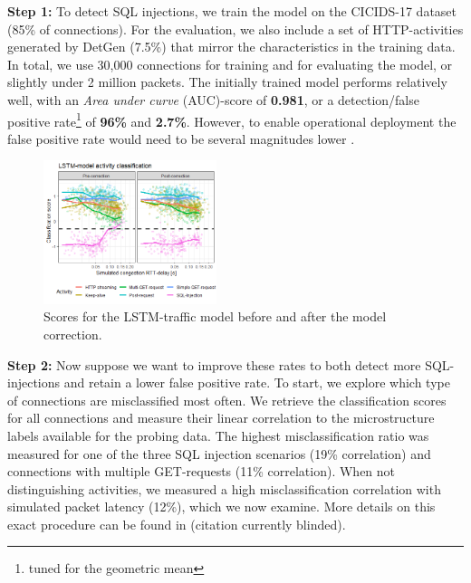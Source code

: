 \documentclass[10pt,conference]{IEEEtran}
\begin{document}

\textbf{Step 1:} To detect SQL injections, we train the model on the CICIDS-17 dataset \cite{sharafaldin2018toward} (85\% of connections).
For the evaluation, we also include a set of HTTP-activities generated by DetGen (7.5\%) that mirror the characteristics in the training data. %
In total, we use 30,000 connections for training and for evaluating the model, or slightly under 2 million packets.
The initially trained model performs relatively well, with an \textit{Area under curve} (AUC)-score %
 of \textbf{0.981}, or a detection/false positive rate\footnote{tuned for the geometric mean} of \textbf{96\%} and \textbf{2.7\%}. However, to enable operational deployment the false positive rate would need to be several magnitudes lower \cite{mell2003overview}. 


\begin{figure}
\centering
\includegraphics[width=0.45\textwidth]{images/LSTM_classi.png}
\caption{Scores for the LSTM-traffic model before and after the model correction.}\label{fig:LSTM_exp}
\end{figure}


\textbf{Step 2:} Now suppose we want to improve these rates to both detect more SQL-injections and retain a lower false positive rate. To start, we explore which type of connections are misclassified most often. We retrieve the classification scores for all connections and measure their linear correlation to the microstructure labels available for the probing data. The highest misclassification ratio was measured for one of the three SQL injection scenarios (19\% correlation) and connections with multiple GET-requests (11\% correlation). When not distinguishing activities, we measured a high misclassification correlation with simulated packet latency (12\%), which we now examine. More details on this exact procedure can be found in (citation currently blinded).
\end{document}
